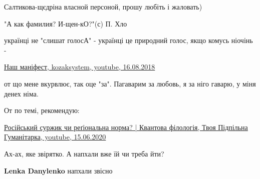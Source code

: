 Салтикова-щєдріна власной персоной, прошу любіть і жаловать)

 
"А как фамилия? И-щен-кО?"(с) П. Хло

 
українці не "слишат голосА" - українці це природний голос, якщо комусь ніочінь -

\href{https://www.youtube.com/watch?v=f4oqrDTVPJc}{%
Наш маніфест, kozaksystem, youtube, 16.08.2018%
}

 
от що мене вкурвлює, так оце "за". Пагаварим за любовь, я за ніго гаварю, у
міня денех німа.

 
От по темі, рекомендую:

\href{https://www.youtube.com/watch?v=AiiWg9_XRTo}{%
Російський суржик чи реґіональна норма? | Квантова філологія, Твоя Підпільна Гуманітарка, %
youtube, 15.06.2020%
}

 
Ах-ах, яке звірятко.
А напхали вже їй чи треба йти?

\begin{itemize} %
 
\textbf{Lenka Danylenko} напхали звісно
\end{itemize} %

